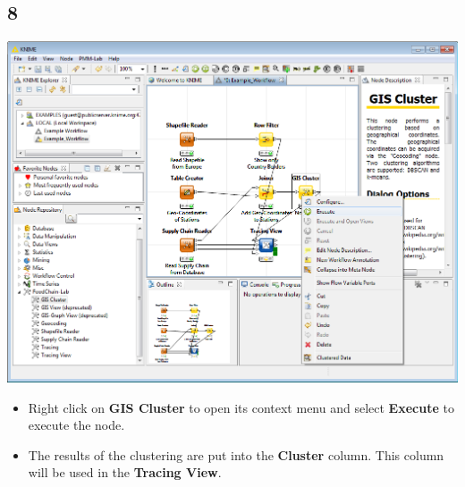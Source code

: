\documentclass{beamer}
\begin{document}
\subsection{8}
\begin{frame}
	\begin{center}
  		\includegraphics[height=0.6\textheight]{8.png}
	\end{center}
	\begin{itemize}
		\item Right click on \textbf{GIS Cluster} to open its context menu and select \textbf{Execute} to execute the node.
		\item The results of the clustering are put into the \textbf{Cluster} column. This column will be used in the \textbf{Tracing View}.
	\end{itemize}
\end{frame}
\end{document}
